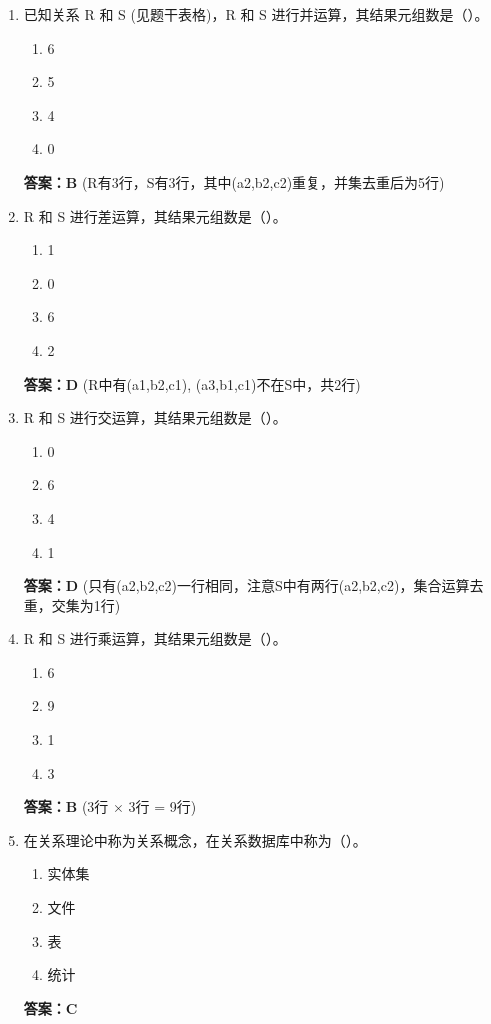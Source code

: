 \documentclass[12pt, a4paper]{article}
\begin{document}
\begin{enumerate}[label=\arabic*.]
    \item 已知关系 R 和 S (见题干表格)，R 和 S 进行并运算，其结果元组数是（\quad）。
    \begin{enumerate}
        \item 6
        \item 5
        \item 4
        \item 0
    \end{enumerate}
    \textbf{答案：B} (R有3行，S有3行，其中(a2,b2,c2)重复，并集去重后为5行)

    \item R 和 S 进行差运算，其结果元组数是（\quad）。
    \begin{enumerate}
        \item 1
        \item 0
        \item 6
        \item 2
    \end{enumerate}
    \textbf{答案：D} (R中有(a1,b2,c1), (a3,b1,c1)不在S中，共2行)

    \item R 和 S 进行交运算，其结果元组数是（\quad）。
    \begin{enumerate}
        \item 0
        \item 6
        \item 4
        \item 1
    \end{enumerate}
    \textbf{答案：D} (只有(a2,b2,c2)一行相同，注意S中有两行(a2,b2,c2)，集合运算去重，交集为1行)

    \item R 和 S 进行乘运算，其结果元组数是（\quad）。
    \begin{enumerate}
        \item 6
        \item 9
        \item 1
        \item 3
    \end{enumerate}
    \textbf{答案：B} (3行 $\times$ 3行 = 9行)

    \item 在关系理论中称为关系概念，在关系数据库中称为（\quad）。
    \begin{enumerate}
        \item 实体集
        \item 文件
        \item 表
        \item 统计
    \end{enumerate}
    \textbf{答案：C}


\end{enumerate}
\end{document}
